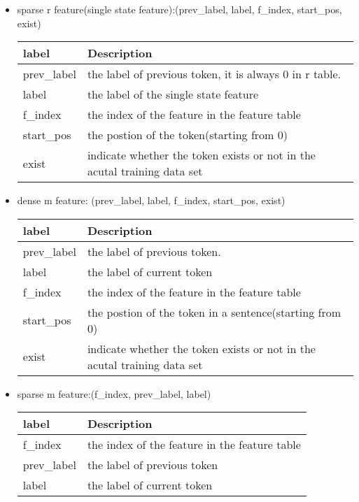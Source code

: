 \begin{itemize}

\item 
sparse r feature(single state feature):(prev\_label, label, f\_index, start\_pos, exist)

\begin{center}
    \begin{tabular}{ | l | l |}
    \hline
    label & Description \\ \hline
    prev\_label & the label of previous token, it is always 0 in r table.\\ 
    label       & the label of the single state feature\\
    f\_index    & the index of the feature in the feature table\\
    start\_pos  & the postion of the token(starting from 0)\\
    exist       & indicate whether the token exists or not in the acutal training data set\\
    \hline
    \end{tabular}
\end{center}

\item 
dense m feature:
(prev\_label, label, f\_index, start\_pos, exist)
\begin{center}
    \begin{tabular}{ | l | l |}
    \hline
    label & Description \\ \hline
    prev\_label & the label of previous token.\\ 
    label       & the label of current token\\
    f\_index    & the index of the feature in the feature table\\
    start\_pos  & the postion of the token in a sentence(starting from 0)\\
    exist       & indicate whether the token exists or not in the acutal training data set\\
    \hline
    \end{tabular}
\end{center}

\item 
sparse m feature:(f\_index, prev\_label, label)
\begin{center}
    \begin{tabular}{ | l | l |}
    \hline
    label & Description \\ \hline
    f\_index    &  the index of the feature in the feature table\\
    prev\_label &  the label of previous token \\
    label       &  the label of current token\\
    \hline
    \end{tabular}
\end{center}

\end{itemize}
